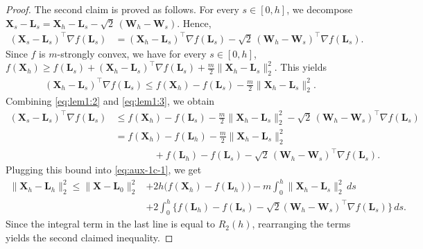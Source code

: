 \documentclass[aos,reqno]{imsart}
\newcommand\bL{\boldsymbol L}
\newcommand\bX{\boldsymbol X}
\newcommand\bW{\boldsymbol W}
\theoremstyle{definition}
\begin{document}
\begin{proof}
    The second claim is proved as follows. For every $s\in[0,h]$, we decompose $\bX_s-\bL_s= \bX_h-\bL_s - \sqrt{2}\,(\bW_h - 
    \bW_s)$. Hence,
    \begin{align}\label{eq:lem1:2}
        (\bX_s-\bL_s)^\top \nabla f(\bL_s)
        &= (\bX_h-\bL_s)^\top \nabla f(\bL_s)
        - \sqrt{2}\,(\bW_h-\bW_s)^\top \nabla f(\bL_s).
    \end{align}
    Since $f$ is $m$-strongly convex, we have for every $s\in[0,h]$,
    $f(\bX_h) \geqslant f(\bL_s) + (\bX_h - \bL_s)^\top \nabla f(\bL_s)   
    + \frac{m}{2}\|\bX_h-\bL_s\|_2^2$.
    This yields
    \begin{align}\label{eq:lem1:3}
        (\bX_h-\bL_s)^\top \nabla f(\bL_s)
        \leqslant f(\bX_h)-f(\bL_s)
        - \frac{m}{2}\|\bX_h-\bL_s\|_2^2.
    \end{align}
    Combining \eqref{eq:lem1:2} and \eqref{eq:lem1:3}, we 
    obtain
    \begin{align}
        (\bX_s-\bL_s)^\top \nabla f(\bL_s)
        &\leqslant f(\bX_h)-f(\bL_s)
        - \frac{m}{2}\|\bX_h-\bL_s\|_2^2
        - \sqrt{2}\,(\bW_h-\bW_s)^\top \nabla f(\bL_s)\\
        &= f(\bX_h) - f(\bL_h) 
        - \frac{m}{2}\|\bX_h-\bL_s\|_2^2 \\
       &\qquad\qquad+ f(\bL_h) - 
        f(\bL_s)- \sqrt{2}\,(\bW_h-\bW_s)^\top
       \nabla f(\bL_s).
    \end{align}
    Plugging this bound into \eqref{eq:aux-1c-1}, we get
    \begin{align}\label{eq:aux-1c-2}
        \|\bX_h-\bL_h\|_2^2
        \leqslant \|\bX-\bL_0\|_2^2
        &+ 2h \big(f(\bX_h) - f(\bL_h)\big) - m\int_0^h 
        \|\bX_h-\bL_s\|_2^2\,ds \\
        &+ 2\int_0^h\big\{f(\bL_h) - f(\bL_s) - \sqrt{2}
        (\bW_h-\bW_s)^\top \nabla f(\bL_s)\big\}\,ds.
    \end{align}
    Since the integral term in the last line is equal to 
    $R_2(h)$, rearranging the terms yields the second 
    claimed inequality.
\end{proof}
\end{document}
